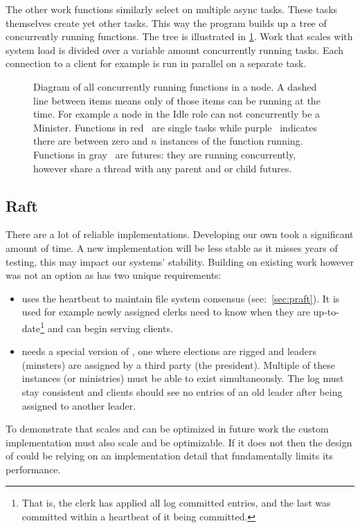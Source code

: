 The other work functions similarly select on multiple async tasks. These tasks themselves create yet other tasks. This way the program builds up a tree of concurrently running functions. The tree is illustrated in \cref{fig:tree}. Work that scales with system load is divided over a variable amount concurrently running tasks. Each connection to a client for example is run in parallel on a separate task.
%
\clearpage
\thispagestyle{empty}
\begin{figure}[htbp]
	\centering
	
	\caption{Diagram of all concurrently running functions in a node. A dashed line between items means only of those items can be running at the time. For example a node in the Idle role can not concurrently be a Minister. Functions in red~\taskLeg{} are single tasks while purple~\tasksLeg{} indicates there are between zero and $n$ instances of the function running. Functions in gray~\futureLeg{} are futures: they are running concurrently, however share a thread with any parent and or child futures.}
	\label{fig:tree}
\end{figure}
\clearpage

\subsection{Raft}
There are a lot of reliable \raft{} implementations. Developing our own took a significant amount of time. A new implementation will be less stable as it misses years of testing, this may impact our systems' stability. Building on existing work however was not an option as \name{} has two unique requirements: 
%
\begin{itemize}
	\item \Name{} uses the \raft{} heartbeat to maintain file system consensus (see:~\cref{sec:praft}). It is used for example newly assigned clerks need to know when they are up-to-date\footnote{That is, the clerk has applied all log committed entries, and the last was committed within a \raft{} heartbeat of it being committed.} and can begin serving clients. 
	\item \Name{} needs a special version of \raft{}, one where elections are rigged and leaders (minsters) are assigned by a third party (the president). Multiple of these instances (or ministries) must be able to exist simultaneously. The log must stay consistent and clients should see no entries of an old leader after being assigned to another leader. 
\end{itemize}
%
To demonstrate that \name{} scales and can be optimized in future work %
the custom implementation must also scale and be optimizable. If it does not then the design of \name{} could be relying on an implementation detail that fundamentally limits its performance.
%
